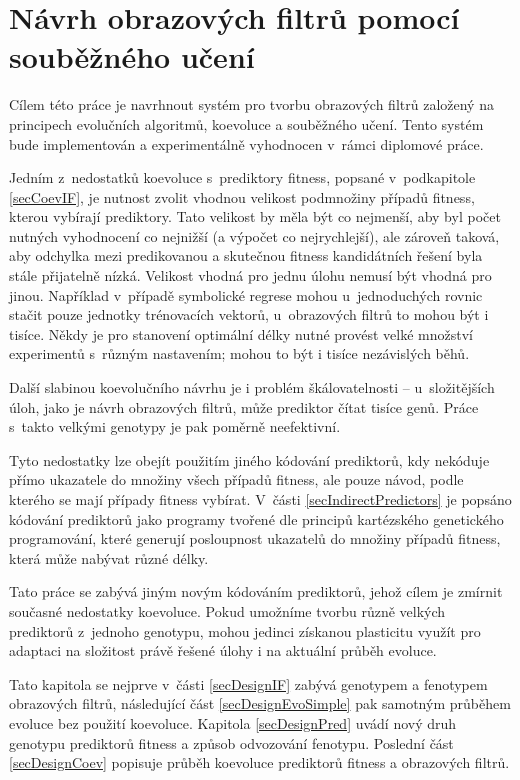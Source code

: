 \chapter{Návrh obrazových filtrů pomocí souběžného učení}
\label{chDesign}

Cílem této práce je navrhnout systém pro tvorbu obrazových filtrů založený na principech evolučních algoritmů, koevoluce a souběžného učení. Tento systém bude implementován a experimentálně vyhodnocen v~rámci diplomové práce.

Jedním z~nedostatků koevoluce s~prediktory fitness, popsané v~podkapitole \ref{secCoevIF}, je nutnost zvolit vhodnou velikost podmnožiny případů fitness, kterou vybírají prediktory. Tato velikost by měla být co nejmenší, aby byl počet nutných vyhodnocení co nejnižší (a výpočet co nejrychlejší), ale zároveň taková, aby odchylka mezi predikovanou a skutečnou fitness kandidátních řešení byla stále přijatelně nízká. Velikost vhodná pro jednu úlohu nemusí být vhodná pro jinou. Například v~případě symbolické regrese mohou u~jednoduchých rovnic stačit pouze jednotky trénovacích vektorů, u~obrazových filtrů to mohou být i tisíce. Někdy je pro stanovení optimální délky nutné provést velké množství experimentů s~různým nastavením; mohou to být i tisíce nezávislých běhů.

Další slabinou koevolučního návrhu je i problém škálovatelnosti -- u~složitějších úloh, jako je návrh obrazových filtrů, může prediktor čítat tisíce genů. Práce s~takto velkými genotypy je pak poměrně neefektivní.

Tyto nedostatky lze obejít použitím jiného kódování prediktorů, kdy nekóduje přímo ukazatele do množiny všech případů fitness, ale pouze návod, podle kterého se mají případy fitness vybírat. V~části \ref{secIndirectPredictors} je popsáno kódování prediktorů jako programy tvořené dle principů kartézského genetického programování, které generují posloupnost ukazatelů do množiny případů fitness, která může nabývat různé délky.

Tato práce se zabývá jiným novým kódováním prediktorů, jehož cílem je zmírnit současné nedostatky koevoluce. Pokud umožníme tvorbu různě velkých prediktorů z~jednoho genotypu, mohou jedinci získanou plasticitu využít pro adaptaci na složitost právě řešené úlohy i na aktuální průběh evoluce.

Tato kapitola se nejprve v~části \ref{secDesignIF} zabývá genotypem a fenotypem obrazových filtrů, následující část \ref{secDesignEvoSimple} pak samotným průběhem evoluce bez použití koevoluce. Kapitola \ref{secDesignPred} uvádí nový druh genotypu prediktorů fitness a způsob odvozování fenotypu. Poslední část \ref{secDesignCoev} popisuje průběh koevoluce prediktorů fitness a obrazových filtrů.

